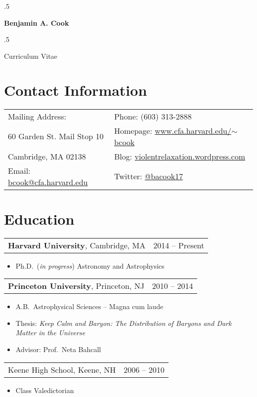 \documentclass{res}
\newcommand\mancenter[1]{\moveleft.5\hoffset\centerline{#1}}
\begin{document}
  
\mancenter{\huge \bf{Benjamin A. Cook}}
\mancenter{\huge Curriculum Vitae} 

\begin{resume}                        

\section{\textbf{Contact Information}}
\vspace{.1in}
\begin{tabular}{@{}p{2.5in} p{2.5in}}
Mailing Address: & Phone: (603) 313-2888\\
60 Garden St. Mail Stop 10 & Homepage:
\href{http://www.cfa.harvard.edu/~bcook}{www.cfa.harvard.edu/$\sim$bcook}\\
Cambridge, MA 02138 & Blog:
\href{http://violentrelaxation.wordpress.com}{violentrelaxation.wordpress.com}\\
Email: \href{mailto:bcook@cfa.harvard.edu}{bcook@cfa.harvard.edu} &
Twitter: \href{https://twitter.com/bacook17}{@bacook17}\\
\end{tabular}


\section{\textbf{Education}}
\vspace{.1in}
\begin{tabular}{@{}p{4in} r@{}}
\textbf{Harvard University}, Cambridge, MA & 2014 -- Present
\end{tabular}
\begin{itemize} \itemsep -2pt
\item[] Ph.D.~(\textit{in progress}) Astronomy and Astrophysics
\end{itemize}

\begin{tabular}{@{}p{4in} r@{}}
\textbf{Princeton University}, Princeton, NJ & 2010 -- 2014
\end{tabular}
\begin{itemize} \itemsep -2pt
\item[] A.B.~Astrophysical Sciences -- Magna cum laude
\item[] Thesis: \textit{Keep Calm and Baryon: The Distribution of
  Baryons and Dark Matter in the Universe}
\item[] Advisor: Prof.~Neta Bahcall
\end{itemize}

\begin{tabular}{@{}p{4in} r@{}}
  Keene High School, Keene, NH & 2006 -- 2010
\end{tabular}
\begin{itemize} \itemsep -2pt
\item[] Class Valedictorian
\end{itemize}


\end{resume}
\end{document}
